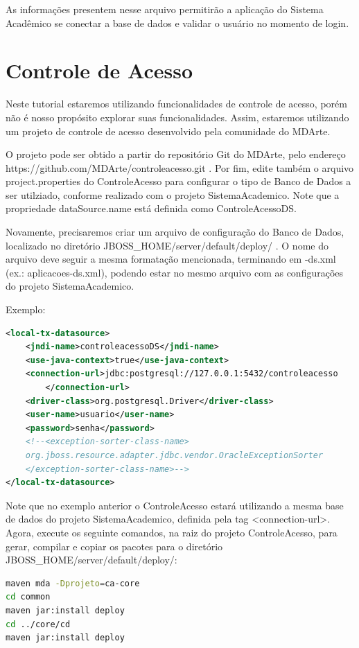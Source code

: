 As informações presentem nesse arquivo permitirão a aplicação do Sistema Acadêmico se conectar a base de dados e validar o usuário no momento de login.

\section{Controle de Acesso}

Neste tutorial estaremos utilizando funcionalidades de controle de acesso, porém não é nosso propósito explorar suas funcionalidades. Assim, estaremos utilizando um projeto de controle de acesso desenvolvido pela comunidade do MDArte.

O projeto pode ser obtido a partir do repositório Git do MDArte, pelo endereço https://github.com/MDArte/controleacesso.git . Por fim, edite também o arquivo project.properties do ControleAcesso para configurar o tipo de Banco de Dados a ser utilziado, conforme realizado com o projeto SistemaAcademico. Note que a propriedade dataSource.name está definida como ControleAcessoDS.

Novamente, precisaremos criar um arquivo de configuração do Banco de Dados, localizado no diretório JBOSS\_HOME/server/default/deploy/ . O nome do arquivo deve seguir a mesma formatação mencionada, terminando em -ds.xml (ex.: aplicacoes-ds.xml), podendo estar no mesmo arquivo com as configurações do projeto SistemaAcademico.

Exemplo:

\begin{lstlisting}[language=xml]
<local-tx-datasource>
	<jndi-name>controleacessoDS</jndi-name>
	<use-java-context>true</use-java-context>
	<connection-url>jdbc:postgresql://127.0.0.1:5432/controleacesso
		</connection-url> 
	<driver-class>org.postgresql.Driver</driver-class>
	<user-name>usuario</user-name>
	<password>senha</password>
	<!--<exception-sorter-class-name>
	org.jboss.resource.adapter.jdbc.vendor.OracleExceptionSorter
	</exception-sorter-class-name>-->
</local-tx-datasource>
\end{lstlisting}

Note que no exemplo anterior o ControleAcesso estará utilizando a mesma base de dados do projeto SistemaAcademico, definida pela tag <connection-url>. Agora, execute os seguinte comandos, na raiz do projeto ControleAcesso, para gerar, compilar e copiar os pacotes para o diretório JBOSS\_HOME/server/default/deploy/:

\begin{lstlisting}[language=bash]
maven mda -Dprojeto=ca-core
cd common
maven jar:install deploy
cd ../core/cd
maven jar:install deploy
\end{lstlisting}

